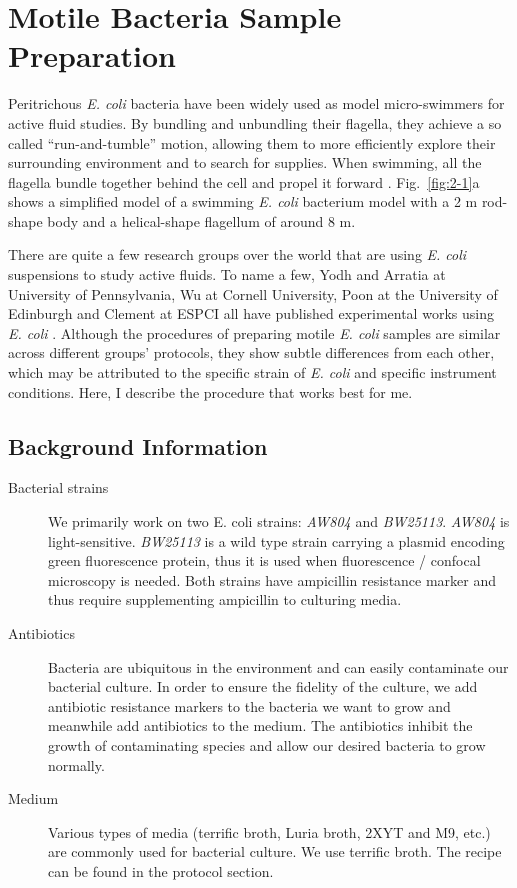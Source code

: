 \section{Motile Bacteria Sample Preparation}
\label{motile-bacteria-sample-preparation}
Peritrichous \textit{E. coli} bacteria have been widely used as model micro-swimmers for active fluid studies. By bundling and unbundling their flagella, they achieve a so called ``run-and-tumble'' motion, allowing them to more efficiently explore their surrounding environment and to search for supplies. When swimming, all the flagella bundle together behind the cell and propel it forward \cite{Lauga2015}. Fig.~\ref{fig:2-1}a shows a simplified model of a swimming \textit{E. coli} bacterium model with a 2 \textmu m rod-shape body and a helical-shape flagellum of around 8 \textmu m.

There are quite a few research groups over the world that are using \textit{E. coli} suspensions to study active fluids. To name a few, Yodh and Arratia at University of Pennsylvania, Wu at Cornell University, Poon at the University of Edinburgh and Clement at ESPCI all have published experimental works using \textit{E. coli} \cite{Chen2007, Patteson2016, Kasyap2014, Jepson2013, Mino2011}. Although the procedures of preparing motile \textit{E. coli} samples are similar across different groups' protocols, they show subtle differences from each other, which may be attributed to the specific strain of \textit{E. coli} and specific instrument conditions. Here, I describe the procedure that works best for me.

\subsection{Background Information}
\begin{description}
  \item [Bacterial strains] We primarily work on two E. coli strains: \textit{AW804} and \textit{BW25113}. \textit{AW804} is light-sensitive. \textit{BW25113} is a wild type strain carrying a plasmid encoding green fluorescence protein, thus it is used when fluorescence / confocal microscopy is needed. Both strains have ampicillin resistance marker and thus require supplementing ampicillin to culturing media.
  \item [Antibiotics] Bacteria are ubiquitous in the environment and can easily  contaminate our bacterial culture. In order to ensure the fidelity of the culture, we add antibiotic resistance markers to the bacteria we want to grow and meanwhile add antibiotics to the medium. The antibiotics inhibit the growth of contaminating species and allow our desired bacteria to grow normally.
  \item [Medium] Various types of media (terrific broth, Luria broth, 2XYT and M9, etc.) are commonly used for bacterial culture. We use terrific broth. The recipe can be found in the protocol section.
\end{description}

